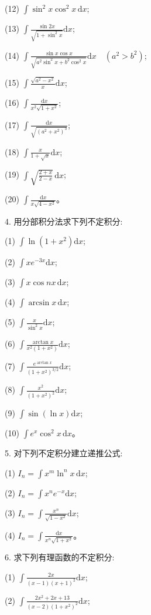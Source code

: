 \documentclass[UTF8, 12pt, fontset=fandol, oneside]{ctexart}
\begin{document}
(12) $\displaystyle \int\sin^2x\cos^2x\,\mathrm dx$;

(13) $\displaystyle \int\frac{\sin2x}{\sqrt{1+\sin^2x}}\mathrm dx$;

(14) $\displaystyle \int\frac{\sin x\cos x}{\sqrt{a^2\sin^2x+b^2\cos^2x}}\mathrm dx\quad(a^2>b^2)$;

(15) $\displaystyle \int\frac{\sqrt{a^2-x^2}}x\mathrm dx$;

(16) $\displaystyle \int\frac{\mathrm dx}{x^2\sqrt{1+x^2}}$;

(17) $\displaystyle \int\frac{\mathrm dx}{\sqrt{(a^2+x^2)^3}}$;

(18) $\displaystyle \int\frac{x}{1+\sqrt x}\mathrm dx$;

(19) $\displaystyle \int\sqrt{\frac{2+x}{2-x}}\,\mathrm dx$;

(20) $\displaystyle \int\frac{\mathrm dx}{x\sqrt{4-x^2}}$。

4. 用分部积分法求下列不定积分:

(1) $\displaystyle \int\ln(1+x^2)\mathrm dx$;

(2) $\displaystyle \int xe^{-3x}\mathrm dx$;

(3) $\displaystyle \int x\cos nx\,\mathrm dx$;

(4) $\displaystyle \int\arcsin x\,\mathrm dx$;

(5) $\displaystyle \int\frac{x}{\sin^2x}\mathrm dx$;

(6) $\displaystyle \int\frac{\arctan x}{x^2(1+x^2)}\mathrm dx$;

(7) $\displaystyle \int\frac{e^{\arctan x}}{(1+x^2)^{3/2}}\mathrm dx$;

(8) $\displaystyle \int\frac{x^2}{(1+x^2)^2}\mathrm dx$;

(9) $\displaystyle \int\sin(\ln x)\mathrm dx$;

(10) $\displaystyle \int e^x\cos^2x\,\mathrm dx$。

5. 对下列不定积分建立递推公式:

(1) $\displaystyle I_n=\int x^m\ln^nx\,\mathrm dx$;

(2) $\displaystyle I_n=\int x^ne^{-x}\mathrm dx$;

(3) $\displaystyle I_n=\int\frac{x^n}{\sqrt{1-x^2}}\mathrm dx$;

(4) $\displaystyle I_n=\int\frac{\mathrm dx}{x^n\sqrt{1+x^2}}$。

6. 求下列有理函数的不定积分:

(1) $\displaystyle \int\frac{2x}{(x-1)(x+1)^2}\mathrm dx$;

(2) $\displaystyle \int\frac{2x^2+2x+13}{(x-2)(1+x^2)^2}\mathrm dx$;
\end{document}
